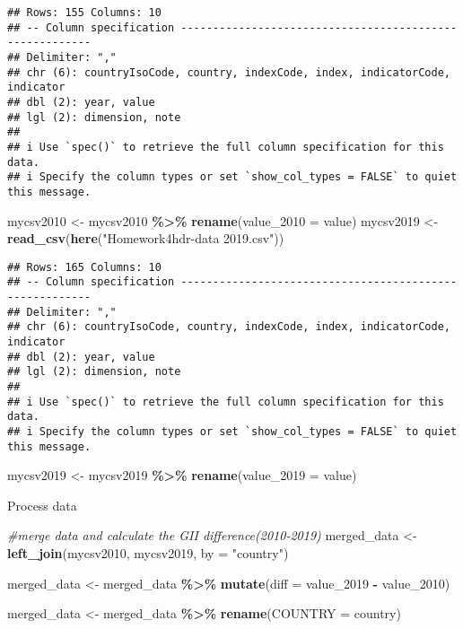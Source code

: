 \documentclass[
]{article}
\newenvironment{Shaded}{\begin{snugshade}}{\end{snugshade}}
\newcommand{\AttributeTok}[1]{\textcolor[rgb]{0.13,0.29,0.53}{#1}}
\newcommand{\CommentTok}[1]{\textcolor[rgb]{0.56,0.35,0.01}{\textit{#1}}}
\newcommand{\FunctionTok}[1]{\textcolor[rgb]{0.13,0.29,0.53}{\textbf{#1}}}
\newcommand{\NormalTok}[1]{#1}
\newcommand{\OtherTok}[1]{\textcolor[rgb]{0.56,0.35,0.01}{#1}}
\newcommand{\SpecialCharTok}[1]{\textcolor[rgb]{0.81,0.36,0.00}{\textbf{#1}}}
\newcommand{\StringTok}[1]{\textcolor[rgb]{0.31,0.60,0.02}{#1}}
\begin{document}
\begin{verbatim}
## Rows: 155 Columns: 10
## -- Column specification --------------------------------------------------------
## Delimiter: ","
## chr (6): countryIsoCode, country, indexCode, index, indicatorCode, indicator
## dbl (2): year, value
## lgl (2): dimension, note
## 
## i Use `spec()` to retrieve the full column specification for this data.
## i Specify the column types or set `show_col_types = FALSE` to quiet this message.
\end{verbatim}

\begin{Shaded}
\begin{Highlighting}[]
\NormalTok{mycsv2010 }\OtherTok{\textless{}{-}}\NormalTok{ mycsv2010 }\SpecialCharTok{\%\textgreater{}\%} \FunctionTok{rename}\NormalTok{(}\AttributeTok{value\_2010 =}\NormalTok{ value)}
\NormalTok{mycsv2019 }\OtherTok{\textless{}{-}}  \FunctionTok{read\_csv}\NormalTok{(}\FunctionTok{here}\NormalTok{(}\StringTok{"Homework4hdr{-}data 2019.csv"}\NormalTok{))}
\end{Highlighting}
\end{Shaded}

\begin{verbatim}
## Rows: 165 Columns: 10
## -- Column specification --------------------------------------------------------
## Delimiter: ","
## chr (6): countryIsoCode, country, indexCode, index, indicatorCode, indicator
## dbl (2): year, value
## lgl (2): dimension, note
## 
## i Use `spec()` to retrieve the full column specification for this data.
## i Specify the column types or set `show_col_types = FALSE` to quiet this message.
\end{verbatim}

\begin{Shaded}
\begin{Highlighting}[]
\NormalTok{mycsv2019 }\OtherTok{\textless{}{-}}\NormalTok{ mycsv2019 }\SpecialCharTok{\%\textgreater{}\%} \FunctionTok{rename}\NormalTok{(}\AttributeTok{value\_2019 =}\NormalTok{ value)}
\end{Highlighting}
\end{Shaded}

Process data

\begin{Shaded}
\begin{Highlighting}[]
\CommentTok{\#merge data and calculate the GII difference(2010{-}2019)}
\NormalTok{merged\_data }\OtherTok{\textless{}{-}} \FunctionTok{left\_join}\NormalTok{(mycsv2010, mycsv2019, }\AttributeTok{by =} \StringTok{"country"}\NormalTok{)}

\NormalTok{merged\_data }\OtherTok{\textless{}{-}}\NormalTok{ merged\_data }\SpecialCharTok{\%\textgreater{}\%}
  \FunctionTok{mutate}\NormalTok{(}\AttributeTok{diff =}\NormalTok{ value\_2019 }\SpecialCharTok{{-}}\NormalTok{ value\_2010)}

\NormalTok{merged\_data }\OtherTok{\textless{}{-}}\NormalTok{ merged\_data }\SpecialCharTok{\%\textgreater{}\%} \FunctionTok{rename}\NormalTok{(}\AttributeTok{COUNTRY =}\NormalTok{ country)}
\end{Highlighting}
\end{Shaded}
\end{document}
